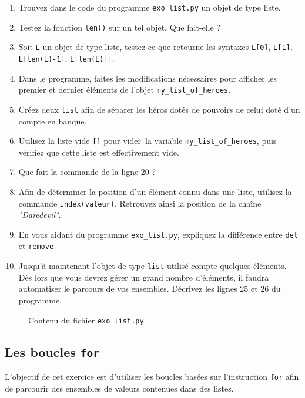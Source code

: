 \begin{enumerate}
\item Trouvez dans le code du programme \texttt{exo\_list.py} un objet
  de type liste.
\item Testez la fonction \verb+len()+ sur un tel objet. Que fait-elle ?
\item Soit \verb+L+ un objet de type liste, testez ce que retourne
  les syntaxes \verb+L[0]+, \verb+L[1]+, \verb+L[len(L)-1]+, \verb+L[len(L)]]+. 
\item  Dans le programme, faites  les
  modifications  nécessaires pour  afficher  les premier et  dernier
  éléments de l'objet \texttt{my\_list\_of\_heroes}.  %
\item  Créez deux  \texttt{list} afin  de séparer  les héros  dotés de
  pouvoirs de celui doté d'un compte en banque.  %
\item  Utilisez  la liste  vide  \texttt{[]}  pour \og{}vider\fg\  la  variable
  \texttt{my\_list\_of\_heroes},
  puis  vérifiez que  cette liste
  est effectivement vide.  %
\item Que fait la commande de la ligne 20 ?  %
\item  Afin de  déterminer la  position  d'un élément  connu dans  une
  liste, utilisez la commande \texttt{index(valeur)}.  Retrouvez ainsi
  la position de la chaîne \textit{"Daredevil"}.

\item En vous aidant  du programme \texttt{exo\_list.py}, expliquez la
  différence entre \texttt{del} et \texttt{remove}

\item Jusqu'à maintenant l'objet de type \texttt{list} utilisé compte quelques
  éléments. Dès lors que vous  devrez gérer un grand nombre d'éléments,
  il faudra  automatiser le parcours  de vos ensembles.   Décrivez les
  lignes 25 et 26 du programme.
\end{enumerate}
\begin{figure}  
  
  \caption{Contenu du fichier \texttt{exo\_list.py}}
\end{figure}

\subsection{Les boucles  \texttt{for}}

L'objectif  de cet  exercice est  d'utiliser les  boucles basées sur
l'instruction \texttt{for} afin  de  parcourir  des  ensembles  de
valeurs  contenues  dans  des listes.


